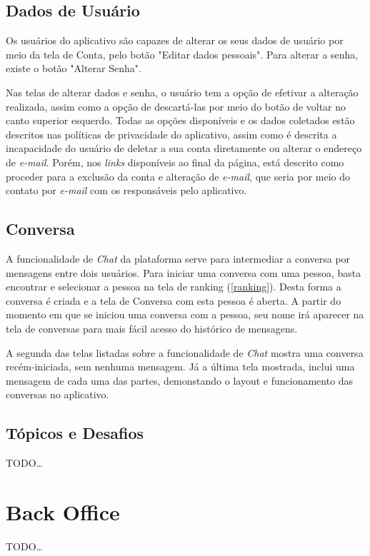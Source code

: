 \subsection{Dados de Usuário}

Os usuários do aplicativo são capazes de alterar os seus dados de usuário por meio da tela de Conta, pelo botão "Editar dados pessoais". Para alterar a senha, existe o botão "Alterar Senha".


Nas telas de alterar dados e senha, o usuário tem a opção de efetivar a alteração realizada, assim como a opção de descartá-las por meio do botão de voltar no canto superior esquerdo. Todas as opções disponíveis e os dados coletados estão descritos nas políticas de privacidade do aplicativo, assim como é descrita a incapacidade do usuário de deletar a sua conta diretamente ou alterar o endereço de \textit{e-mail}. Porém, nos \textit{links} disponíveis ao final da página, está descrito como proceder para a exclusão da conta e alteração de \textit{e-mail}, que seria por meio do contato por \textit{e-mail} com os responsáveis pelo aplicativo.

\subsection{Conversa}

A funcionalidade de \textit{Chat} da plataforma serve para intermediar a conversa por mensagens entre dois usuários. Para iniciar uma conversa com uma pessoa, basta encontrar e selecionar a pessoa na tela de ranking (\ref{ranking}). Desta forma a conversa é criada e a tela de Conversa com esta pessoa é aberta. A partir do momento em que se iniciou uma conversa com a pessoa, seu nome irá aparecer na tela de conversas para mais fácil acesso do histórico de mensagens.


A segunda das telas listadas sobre a funcionalidade de \textit{Chat} mostra uma conversa recém-iniciada, sem nenhuma mensagem. Já a última tela mostrada, inclui uma mensagem de cada uma das partes, demonstando o layout e funcionamento das conversas no aplicativo.

\subsection{Tópicos e Desafios}
\label{topics_challenges}

TODO\dots

\section{Back Office}
\label{backoffice}

TODO\dots
